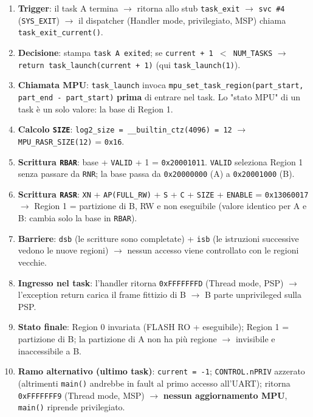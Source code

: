 \begin{enumerate}
    \item \textbf{Trigger}: il task A termina $\rightarrow$ ritorna allo stub \texttt{task\_exit} $\rightarrow$ \texttt{svc \#4} (\texttt{SYS\_EXIT}) $\rightarrow$ il dispatcher (Handler mode, privilegiato, MSP) chiama \texttt{task\_exit\_current()}.
    \item \textbf{Decisione}: stampa \texttt{task A exited}; se \texttt{current + 1 $<$ NUM\_TASKS} $\rightarrow$ \texttt{return task\_launch(current + 1)} (qui \texttt{task\_launch(1)}).
    \item \textbf{Chiamata MPU}: \texttt{task\_launch} invoca \texttt{mpu\_set\_task\_region(part\_start, part\_end - part\_start)} \textbf{prima} di entrare nel task. Lo "stato MPU" di un task è un solo valore: la base di Region 1.
    \item \textbf{Calcolo \texttt{SIZE}}: \texttt{log2\_size = \_\_builtin\_ctz(4096) = 12} $\rightarrow$ \texttt{MPU\_RASR\_SIZE(12)} = \texttt{0x16}.
    \item \textbf{Scrittura \texttt{RBAR}}: base + \texttt{VALID} + 1 = \texttt{0x20001011}. \texttt{VALID} seleziona Region 1 senza passare da \texttt{RNR}; la base passa da \texttt{0x20000000} (A) a \texttt{0x20001000} (B).
    \item \textbf{Scrittura \texttt{RASR}}: \texttt{XN} + \texttt{AP(FULL\_RW)} + \texttt{S} + \texttt{C} + \texttt{SIZE} + \texttt{ENABLE} = \texttt{0x13060017} $\rightarrow$ Region 1 = partizione di B, RW e non eseguibile (valore identico per A e B: cambia solo la base in \texttt{RBAR}).
    \item \textbf{Barriere}: \texttt{dsb} (le scritture sono completate) + \texttt{isb} (le istruzioni successive vedono le nuove regioni) $\rightarrow$ nessun accesso viene controllato con le regioni vecchie.
    \item \textbf{Ingresso nel task}: l'handler ritorna \texttt{0xFFFFFFFD} (Thread mode, PSP) $\rightarrow$ l'exception return carica il frame fittizio di B $\rightarrow$ B parte unprivileged sulla PSP.
    \item \textbf{Stato finale}: Region 0 invariata (FLASH RO + eseguibile); Region 1 = partizione di B; la partizione di A non ha più regione $\rightarrow$ invisibile e inaccessibile a B.
    \item \textbf{Ramo alternativo (ultimo task)}: \texttt{current = -1}; \texttt{CONTROL.nPRIV} azzerato (altrimenti \texttt{main()} andrebbe in fault al primo accesso all'UART); ritorna \texttt{0xFFFFFFF9} (Thread mode, MSP) $\rightarrow$ \textbf{nessun aggiornamento MPU}, \texttt{main()} riprende privilegiato.
\end{enumerate}